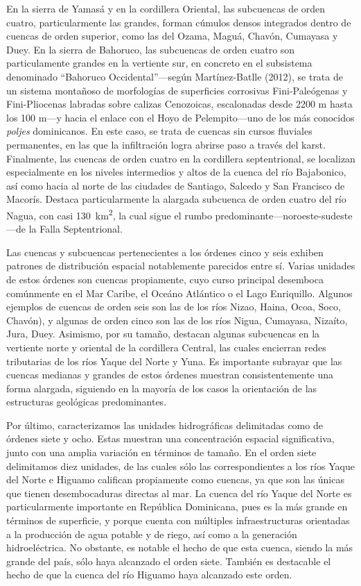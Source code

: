 \documentclass[spanish]{article}
\begin{document}
En la sierra de Yamasá y en la cordillera Oriental, las subcuencas de
orden cuatro, particularmente las grandes, forman cúmulos densos
integrados dentro de cuencas de orden superior, como las del Ozama,
Maguá, Chavón, Cumayasa y Duey. En la sierra de Bahoruco, las subcuencas
de orden cuatro son particulamente grandes en la vertiente sur, en
concreto en el subsistema denominado ``Bahoruco Occidental''---según
Martínez-Batlle (2012), se trata de un sistema montañoso de morfologías
de superficies corrosivas Fini-Paleógenas y Fini-Pliocenas labradas
sobre calizas Cenozoicas, escalonadas desde 2200 m hasta los 100 m---y
hacia el enlace con el Hoyo de Pelempito---uno de los más conocidos
\emph{poljes} dominicanos. En este caso, se trata de cuencas sin cursos
fluviales permanentes, en las que la infiltración logra abrirse paso a
través del karst. Finalmente, las cuencas de orden cuatro en la
cordillera septentrional, se localizan especialmente en los niveles
intermedios y altos de la cuenca del río Bajabonico, así como hacia al
norte de las ciudades de Santiago, Salcedo y San Francisco de Macorís.
Destaca particularmente la alargada subcuenca de orden cuatro del río
Nagua, con casi 130~km\textsuperscript{2}, la cual sigue el rumbo
predominante---noroeste-sudeste---de la Falla Septentrional.

Las cuencas y subcuencas pertenecientes a los órdenes cinco y seis
exhiben patrones de distribución espacial notablemente parecidos entre
sí. Varias unidades de estos órdenes son cuencas propiamente, cuyo curso
principal desemboca comúnmente en el Mar Caribe, el Oceáno Atlántico o
el Lago Enriquillo. Algunos ejemplos de cuencas de orden seis son las de
los ríos Nizao, Haina, Ocoa, Soco, Chavón), y algunas de orden cinco son
las de los ríos Nigua, Cumayasa, Nizaíto, Jura, Duey. Asimismo, por su
tamaño, destacan algunas subcuencas en la vertiente norte y oriental de
la cordillera Central, las cuales encierran redes tributarias de los
ríos Yaque del Norte y Yuna. Es importante subrayar que las cuencas
medianas y grandes de estos órdenes muestran consistentemente una forma
alargada, siguiendo en la mayoría de los casos la orientación de las
estructuras geológicas predominantes.

Por último, caracterizamos las unidades hidrográficas delimitadas como
de órdenes siete y ocho. Estas muestran una concentración espacial
significativa, junto con una amplia variación en términos de tamaño. En
el orden siete delimitamos diez unidades, de las cuales sólo las
correspondientes a los ríos Yaque del Norte e Higuamo califican
propiamente como cuencas, ya que son las únicas que tienen
desembocaduras directas al mar. La cuenca del río Yaque del Norte es
particularmente importante en República Dominicana, pues es la más
grande en términos de superficie, y porque cuenta con múltiples
infraestructuras orientadas a la producción de agua potable y de riego,
así como a la generación hidroeléctrica. No obstante, es notable el
hecho de que esta cuenca, siendo la más grande del país, sólo haya
alcanzado el orden siete. También es destacable el hecho de que la
cuenca del río Higuamo haya alcanzado este orden.
\end{document}
